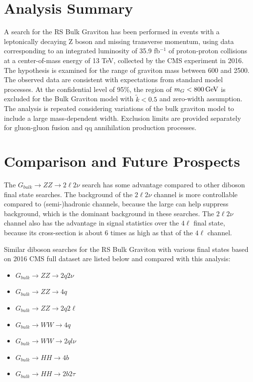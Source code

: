 \section{Analysis Summary}
A search for the RS Bulk Graviton has been performed in events with a leptonically decaying Z boson and missing transverse momentum, using data corresponding to an integrated luminosity of 35.9 fb$^{-1}$ of proton-proton collisions at a center-of-mass energy of 13 TeV, collected by the CMS experiment in 2016. The hypothesis is examined for the range of graviton mass between 600 and 2500\GeV. The observed data are consistent with expectations from standard model processes. At the confidential level of 95\%, the region of $m_G <800\,\text{Ge\hspace{-.08em}V}$ is excluded for the Bulk Graviton model with $\tilde{k}<0.5$ and zero-width assumption. The analysis is repeated considering variations of the bulk graviton model to include a large mass-dependent width. Exclusion limits are provided separately for gluon-gluon fusion and qq annihilation production processes.

\section{Comparison and Future Prospects}
The $G_{bulk}\rightarrow ZZ\rightarrow 2\ell 2\nu$ search has some advantage compared to other diboson final state searches. The background of the $2\ell2\nu$ channel is more controllable compared to (semi-)hadronic channels, because the large \ptmiss can help suppress \Zjets background, which is the dominant background in these searches. The $2\ell2\nu$ channel also has the advantage in signal statistics over the $4\ell$ final state, because its cross-section is about 6 times as high as that of the $4\ell$ channel.

\vspace{0.3cm}
Similar diboson searches for the RS Bulk Graviton with various final states based on 2016 CMS full dataset are listed below and compared with this analysis:
\begin{itemize}
\item $G_{bulk}\rightarrow ZZ\rightarrow 2q 2\nu$~\cite{sum_zzqqnn}
\item $G_{bulk}\rightarrow ZZ\rightarrow 4q$~\cite{sum_vv4q}
\item $G_{bulk}\rightarrow ZZ\rightarrow 2q 2\ell$~\cite{sum_zzqqll}
\item $G_{bulk}\rightarrow WW\rightarrow 4q$~\cite{sum_vv4q}
\item $G_{bulk}\rightarrow WW\rightarrow 2ql\nu$~\cite{sum_wwqqln}
\item $G_{bulk}\rightarrow HH\rightarrow 4b$~\cite{sum_hh4b}
\item $G_{bulk}\rightarrow HH\rightarrow 2b 2\tau$~\cite{sum_hh2b2t}
\end{itemize}

